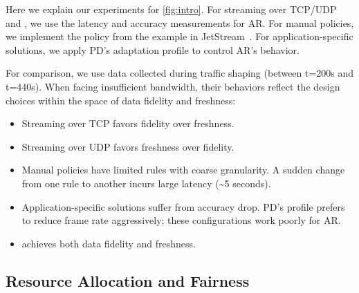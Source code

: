  Here we explain our experiments for
\autoref{fig:intro}. For streaming over TCP/UDP and \sysname{}, we use the
latency and accuracy measurements for AR\@. For manual policies, we implement the
policy from the example in JetStream~\cite{rabkin2014aggregation}. For
application-specific solutions, we apply PD's adaptation profile to control AR's
behavior.

For comparison, we use data collected during traffic shaping (between t=200s and
t=440s). When facing insufficient bandwidth, their behaviors reflect the design
choices within the space of data fidelity and freshness:

\begin{itemize}[leftmargin=*, topsep=0pt, itemsep=0pt]
\item Streaming over TCP favors fidelity over freshness.
\item Streaming over UDP favors freshness over fidelity.
\item Manual policies have limited rules with coarse granularity. A sudden
  change from one rule to another incurs large latency (\textasciitilde 5
  seconds).
\item Application-specific solutions suffer from accuracy drop. PD's profile
  prefers to reduce frame rate aggressively; these configurations work poorly
  for AR\@.
\item \sysname{} achieves both data fidelity and freshness.
\end{itemize}

\subsection{Resource Allocation and Fairness}
\label{sec:multi-task-alloc}

